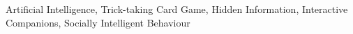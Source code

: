 \begin{abstract}



\end{abstract}

\begin{keywords}
Artificial Intelligence, Trick-taking Card Game, Hidden Information, Interactive Companions, Socially Intelligent Behaviour
\end{keywords}
\clearpage
\thispagestyle{empty}
\cleardoublepage

